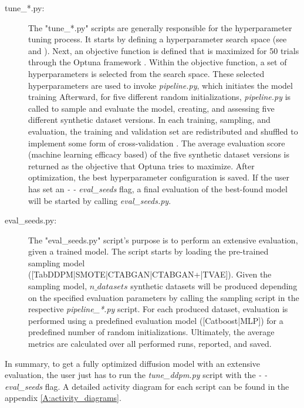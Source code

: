 \begin{description}
	\item[tune\_*.py\footnotemark:]
		The "tune\_*.py" scripts are generally responsible for the hyperparameter tuning process.
		It starts by defining a hyperparameter search space (see \cite[Table 1, p. 4]{kotelnikov2022TabDDPMModellingTabular} and \cite[Table 7-11, p. 13 f.]{kotelnikov2022TabDDPMModellingTabular}).
		Next, an objective function is defined that is maximized for 50 trials through the Optuna framework \cite{optuna_2019}.
		Within the objective function, a set of hyperparameters is selected from the search space.
		These selected hyperparameters are used to invoke \textit{pipeline.py}, which initiates the model training
		Afterward, for five different random initializations, \textit{pipeline.py} is called to sample and evaluate the model, creating, and assessing five different synthetic dataset versions.
		In each training, sampling, and evaluation, the training and validation set are redistributed and shuffled to implement some form of cross-validation \cite{kohavi2001StudyCrossValidationBootstrap}.
		The average evaluation score (machine learning efficacy based) of the five synthetic dataset versions is returned as the objective that Optuna tries to maximize.
		After optimization, the best hyperparameter configuration is saved.
		If the user has set an \textit{- - eval\_seeds} flag, a final evaluation of the best-found model will be started by calling \textit{eval\_seeds.py}.
		
	\item[eval\_seeds.py:]
		The "eval\_seeds.py" script's purpose is to perform an extensive evaluation, given a trained model.
		The script starts by loading the pre-trained sampling model \\([TabDDPM|SMOTE|CTABGAN|CTABGAN+|TVAE]).
		Given the sampling model, $n\_datasets$ synthetic datasets will be produced depending on the specified evaluation parameters by calling the sampling script in the respective \textit{pipeline\_*.py} script.
		For each produced dataset, evaluation is performed using a predefined evaluation model ([Catboost|MLP]) for a predefined number of random initializations.
		Ultimately, the average metrics are calculated over all performed runs, reported, and saved.
\end{description}

In summary, to get a fully optimized diffusion model with an extensive evaluation, the user just has to run the \textit{tune\_ddpm.py} script with the \textit{- - eval\_seeds} flag.
A detailed activity diagram for each script can be found in the appendix \ref{A:activity_diagrams}.

